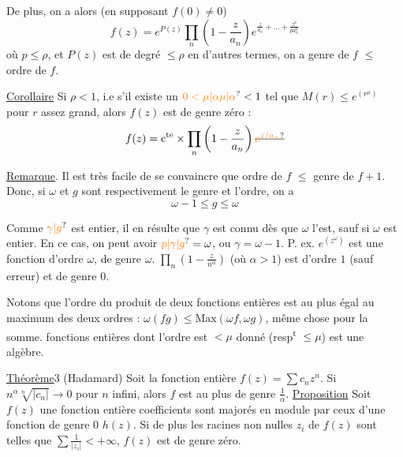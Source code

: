 De plus, on a alors (en supposant $f(0)\ne0$)
\[ f(z)=e^{P(z)}\prod_n\left(1-\frac{z}{a_n}\right)e^{\frac{z}{a_n}+\ldots+\frac{z^p}{p a_n^p}} \]
où $p\leq\rho$, et $P(z)$ est  
de degré $\leq\rho$  en d'autres termes, on
a \qquad genre de $f$ $\leq$ ordre de $f$.

\uline{Corollaire} \quad Si $\rho<1$, i.e s'il existe un $\unsure{0<\mu|\alpha\mu|\alpha}<1$
tel que $M(r)\leq e^{(r^\mu)}$ pour $r$ assez grand,
alors $f(z)$ est de genre zéro :
\[ f(z)=\mathrm c^{\mathrm{te}}\mathbin{\times}\prod_n\left(1-\frac{z}{a_n}\right)\deleted{\unsure{e^{z/a_n}}} \]

\uline{Remarque}. \quad Il est très facile de se convaincre
que \qquad ordre de $f$ $\leq$ genre de $f+1$. Donc, si $\omega$ et
$g$ sont respectivement le genre et l'ordre, on a
\[ \boxed{\omega-1\leq g\leq\omega} \]

Comme $\unsure{\gamma|g}$ est entier, il en résulte que $\gamma$
est connu dès que $\omega$ l'est, sauf si $\omega$ est
entier. En ce cas, on peut avoir $\unsure{p|\gamma|g}=\omega$, ou
$\gamma=\omega-1$.
P. ex.  $e^{(z^\omega)}$ est une fonction d'ordre $\omega$, de
genre $\omega$. $\prod_n\left(1-\frac{z}{n^\alpha}\right)$ (où $\alpha>1$) est d'ordre
$1$ (sauf erreur) et de genre $0$.

Notons que l'ordre du produit de deux
fonctions entières est au plus égal au maximum
des deux ordres : $\omega(fg)\leq\mathrm{Max}(\omega f,\omega g)$, même
chose pour la somme. 
fonctions entières dont l'ordre est $<\mu$ donné
(resp\textsuperscript{t} $\leq\mu$) est une  algèbre.

\uline{Théorème}3 (Hadamard) Soit la fonction entière
$f(z)=\sum c_n z^n$. Si $n^\alpha\sqrt[n]{|c_n|}\longrightarrow0$ pour
$n$ infini, alors $f$ est au plus de genre $\frac1\alpha$.
\uline{Proposition} \quad Soit $f(z)$ une fonction entière   
  coefficients sont majorés en module par
ceux d'une fonction de genre $0$ $h(z)$. Si
de plus les racines non nulles $z_i$ de $f(z)$
sont telles que $\sum\frac{1}{|z_i|}<+\infty$, $f(z)$ est de
genre zéro.

